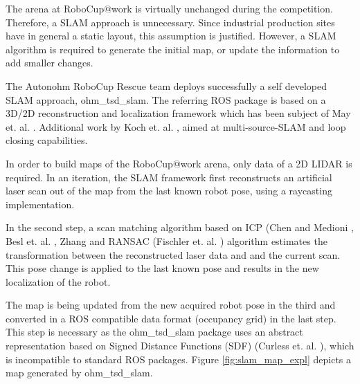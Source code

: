 
The arena at RoboCup$@$work is virtually unchanged during the competition. Therefore, a SLAM approach is unnecessary. Since industrial production sites have in general a static layout, this assumption is justified. However, a SLAM algorithm is required to generate the initial map, or update the information to add smaller changes.

The Autonohm RoboCup Rescue team deploys successfully a self developed SLAM approach, ohm\_tsd\_slam. The referring ROS package is based on a 3D/2D reconstruction and localization framework which has been subject of May et. al. \cite{May2014}. Additional work by Koch et. al. \cite{Koch2015}, aimed at multi-source-SLAM and loop closing capabilities. 

In order to build maps of the RoboCup$@$work arena, only data of a 2D LIDAR is required. In an iteration, the SLAM framework first reconstructs an artificial laser scan out of the map from the last known robot pose, using a raycasting implementation. 

In the second step, a scan matching algorithm based on ICP (Chen and Medioni \cite{chen:icp}, Besl et. al. \cite{bsl:icp}, Zhang \cite{zhang:icp} and RANSAC (Fischler et. al. \cite{Fischler:ransac}) algorithm estimates the transformation between the reconstructed laser data and and the current scan. This pose change is applied to the last known pose and results in the new localization of the robot. 

The map is being updated from the new acquired robot pose in the third and converted in a ROS compatible data format (occupancy grid) in the last step. This step is necessary as the ohm\_tsd\_slam package uses an abstract representation based on Signed Distance Functions (SDF) (Curless et. al. \cite{curless:sdf}), which is incompatible to standard ROS packages. Figure \ref{fig:slam_map_expl} depicts a map generated by ohm\_tsd\_slam.

